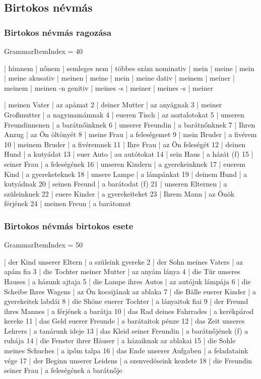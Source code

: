 \documentclass{article}
\newenvironment{desc}{\verbatim}{\endverbatim}
\newenvironment{exmp}{\verbatim}{\endverbatim}
\begin{document}
\subsection{Birtokos névmás}

\subsubsection{Birtokos névmás ragozása}

GrammarItemIndex = 40

\begin{desc}
          | hímnem    | nőnem  | semleges nem | többes szám 
nominativ | mein      | meine  | mein         | meine 
akusativ  | meinen    | meine  | mein         | meine 
dativ     | meinem    | meiner | meinem       | meinen -n 
genitiv   | meines -s | meiner | meines -s    | meiner 
\end{desc}

\begin{exmp}
1 | meinen Vater | az apámat
2 | deiner Mutter | az anyágnak
3 | meiner Großmutter | a nagymamámnak
4 | eueren Tisch | az asztalotokat
5 | unseren Freundinnenen | a barátnőinknek
6 | unserer Freundin | a barátnőnknek
7 | Ihren Anzug | az Ön öltönyét
8 | meine Frau | a feleségemet
9 | mein Bruder | a fivérem
10 | meinem Bruder | a fivéremnek
11 | Ihre Frau | az Ön feleségét
12 | deinen Hund | a kutyádat
13 | euer Auto | au autótokat
14 | sein Haus | a házát (f)
15 | seiner Frau | a feleségének
16 | unseren Kindern | a gyerekeinknek
17 | euerem Kind | a gyereketeknek
18 | unsere Lampe | a lámpánkat
19 | deinem Hund | a kutyádnak
20 | seinen Freund | a barátodat (f)
21 | unseren Elternen | a szüleinknek
22 | euere Kinder | a gyerekeiteket
23 | Ihrem Mann | az Önök férjének
24 | meinen Freun | a barátomat
\end{exmp}

\subsubsection{Birtokos névmás birtokos esete}

GrammarItemIndex = 50

\begin{exmp}
1 | der Kind unserer Eltern | a szüleink gyereke
2 | der Sohn meines Vaters | az apám fia
3 | die Tochter meiner Mutter | az anyám lánya
4 | die Tür unseres Hauses | a házunk ajtaja
5 | die Lampe ihres Autos | az autójuk lámpája
6 | die Scheibe Ihres Wagens | az Ön kocsijának az ablaka
7 | die Bälle euerer Kinder | a gyerekeitek labdái
8 | die Shöne euerer Tochter | a lányaitok fiai
9 | der Freund ihres Mannes | a férjének a barátja
10 | das Rad deines Fahrrades | a kerékpárod kereke
11 | das Geld euerer Freunde | a barátaitok pénze
12 | das Zeit unseres Lehrers | a tanárunk ideje
13 | das Kleid seiner Freundin | a barátnőjének (f) a ruhája
14 | die Fenster ihrer Häuser | a házaiknak az ablakai
15 | die Sohle meines Schuches | a ipőm talpa
16 | das Ende unserer Aufgaben | a feladataink vége
17 | der Beginn unserer Leidens | a szenvedéseink kezdete
18 | die Freundin seiner Frau | a feleségének a barátnője
\end{exmp}
\end{document}
